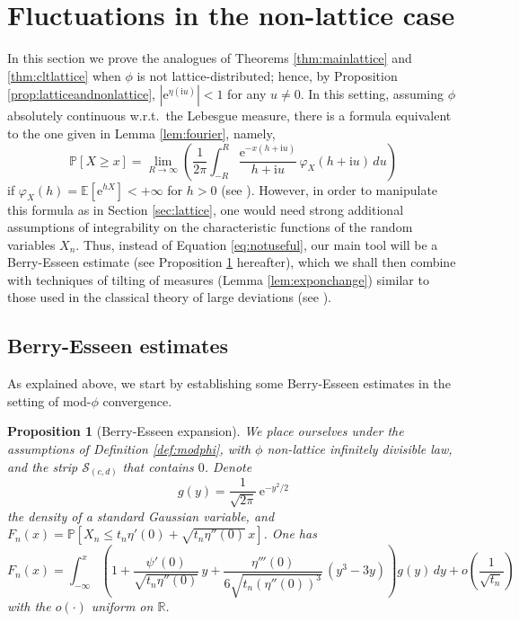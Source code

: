 \documentclass[12pt,a4paper,reqno]{amsart}
\newtheorem{proposition}[lemma]{Proposition}
\theoremstyle{remark}
\newcommand{\R}{\mathbb{R}}
\newcommand{\E}{\mathrm{e}}
\newcommand{\I}{\mathrm{i}}
\newcommand{\esper}{\mathbb{E}}
\newcommand{\proba}{\mathbb{P}}
\begin{document}
\section{Fluctuations in the non-lattice case}\label{sec:nonlattice}
In this section we prove the analogues of Theorems \ref{thm:mainlattice} and \ref{thm:cltlattice} when $\phi$ is not lattice-distributed; hence, by Proposition \ref{prop:latticeandnonlattice}, $|\E^{\eta(\I u)}|<1$ for any $u\neq 0$. In this setting, assuming $\phi$ absolutely continuous w.r.t.~the Lebesgue measure, there is a formula equivalent to the one given in Lemma \ref{lem:fourier}, namely,
\begin{equation}\proba[X\geq x]=\lim_{R \to \infty}\left(\frac{1}{2\pi}\int_{-R}^{R} \frac{\E^{-x(h+\I u)}}{h+\I u}\,\varphi_{X}(h+\I u)\,du\right)\label{eq:notuseful}
\end{equation}
if $\varphi_{X}(h)=\esper[\E^{hX}]<+\infty$ for $h>0$ (see \cite[Chapter XV, Section 3]{Fel71}). However, in order to manipulate this formula as in Section \ref{sec:lattice}, one would need strong additional assumptions of integrability on the characteristic functions of the random variables $X_{n}$. Thus, instead of Equation \eqref{eq:notuseful}, our main tool will be a Berry-Esseen estimate (see Proposition \ref{prop:berryesseen} hereafter), which we shall then combine with techniques of tilting of measures (Lemma \ref{lem:exponchange}) similar to those used in the classical theory of large deviations (see \cite[p. 32]{DZ98}).\bigskip



\subsection{Berry-Esseen estimates}
As explained above, we start by establishing some Berry-Esseen estimates in the setting of mod-$\phi$ convergence.

\begin{proposition}[Berry-Esseen expansion]\label{prop:berryesseen}
We place ourselves under the assumptions of Definition \ref{def:modphi}, with $\phi$ non-lattice infinitely divisible law, and the strip $\mathcal{S}_{(c,d)}$ that contains $0$. Denote 
$$g(y)=\frac{1}{\sqrt{2\pi}}\,\E^{-y^{2}/2}$$
the density of a standard Gaussian variable, and $F_{n}(x)=\proba[X_{n}\leq t_{n}\eta'(0)+\sqrt{t_{n}\eta''(0)}\,x]$. One has
$$F_{n}(x)=\int_{-\infty}^{x} \left(1+\frac{\psi'(0)}{\sqrt{t_n\eta''(0)}}\,y+\frac{\eta'''(0)}{6\sqrt{t_{n}(\eta''(0))^{3}}}\,(y^{3}-3y)\right)g(y)\,dy+o\!\left(\frac{1}{\sqrt{t_n}}\right)$$
with the $o(\cdot)$ uniform on $\R$.
\end{proposition}
\medskip
\end{document}
